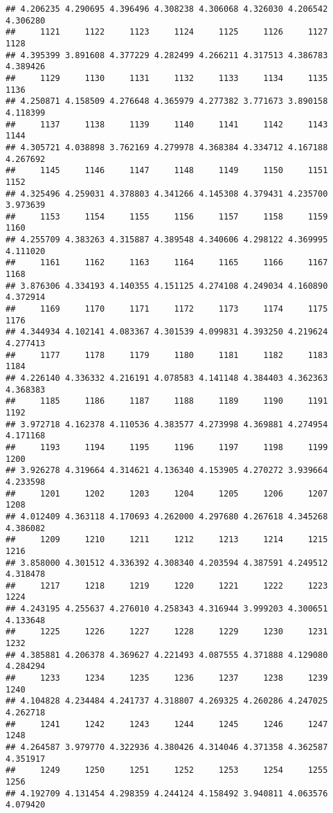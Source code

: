 \documentclass[
]{article}
\begin{document}
\begin{verbatim}
## 4.206235 4.290695 4.396496 4.308238 4.306068 4.326030 4.206542 4.306280 
##     1121     1122     1123     1124     1125     1126     1127     1128 
## 4.395399 3.891608 4.377229 4.282499 4.266211 4.317513 4.386783 4.389426 
##     1129     1130     1131     1132     1133     1134     1135     1136 
## 4.250871 4.158509 4.276648 4.365979 4.277382 3.771673 3.890158 4.118399 
##     1137     1138     1139     1140     1141     1142     1143     1144 
## 4.305721 4.038898 3.762169 4.279978 4.368384 4.334712 4.167188 4.267692 
##     1145     1146     1147     1148     1149     1150     1151     1152 
## 4.325496 4.259031 4.378803 4.341266 4.145308 4.379431 4.235700 3.973639 
##     1153     1154     1155     1156     1157     1158     1159     1160 
## 4.255709 4.383263 4.315887 4.389548 4.340606 4.298122 4.369995 4.111020 
##     1161     1162     1163     1164     1165     1166     1167     1168 
## 3.876306 4.334193 4.140355 4.151125 4.274108 4.249034 4.160890 4.372914 
##     1169     1170     1171     1172     1173     1174     1175     1176 
## 4.344934 4.102141 4.083367 4.301539 4.099831 4.393250 4.219624 4.277413 
##     1177     1178     1179     1180     1181     1182     1183     1184 
## 4.226140 4.336332 4.216191 4.078583 4.141148 4.384403 4.362363 4.368383 
##     1185     1186     1187     1188     1189     1190     1191     1192 
## 3.972718 4.162378 4.110536 4.383577 4.273998 4.369881 4.274954 4.171168 
##     1193     1194     1195     1196     1197     1198     1199     1200 
## 3.926278 4.319664 4.314621 4.136340 4.153905 4.270272 3.939664 4.233598 
##     1201     1202     1203     1204     1205     1206     1207     1208 
## 4.012409 4.363118 4.170693 4.262000 4.297680 4.267618 4.345268 4.386082 
##     1209     1210     1211     1212     1213     1214     1215     1216 
## 3.858000 4.301512 4.336392 4.308340 4.203594 4.387591 4.249512 4.318478 
##     1217     1218     1219     1220     1221     1222     1223     1224 
## 4.243195 4.255637 4.276010 4.258343 4.316944 3.999203 4.300651 4.133648 
##     1225     1226     1227     1228     1229     1230     1231     1232 
## 4.385881 4.206378 4.369627 4.221493 4.087555 4.371888 4.129080 4.284294 
##     1233     1234     1235     1236     1237     1238     1239     1240 
## 4.104828 4.234484 4.241737 4.318807 4.269325 4.260286 4.247025 4.262718 
##     1241     1242     1243     1244     1245     1246     1247     1248 
## 4.264587 3.979770 4.322936 4.380426 4.314046 4.371358 4.362587 4.351917 
##     1249     1250     1251     1252     1253     1254     1255     1256 
## 4.192709 4.131454 4.298359 4.244124 4.158492 3.940811 4.063576 4.079420 

\end{verbatim}
\end{document}
